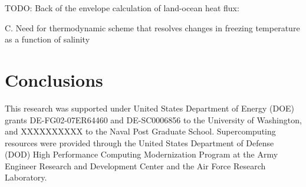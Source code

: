 \documentclass[ms, draft]{agutex}
\begin{document}
\begin{article}
TODO: Back of the envelope calculation of land-ocean heat flux: \citep{Lammers_2007}

C.	Need for thermodynamic scheme that resolves changes in freezing temperature as a function of salinity

\section{Conclusions}




%
%
%
%
%
%
%

\begin{acknowledgments}
This research was supported under United States Department of Energy (DOE) grants DE-FG02-07ER64460 and DE-SC0006856 to the University of Washington, and XXXXXXXXXX to the Naval Post Graduate School.
Supercomputing resources were provided through the United States Department of Defense (DOD) High Performance Computing Modernization Program at the Army Engineer Research and Development Center and the Air Force Research Laboratory.
\end{acknowledgments}


\end{article}
\end{document}

